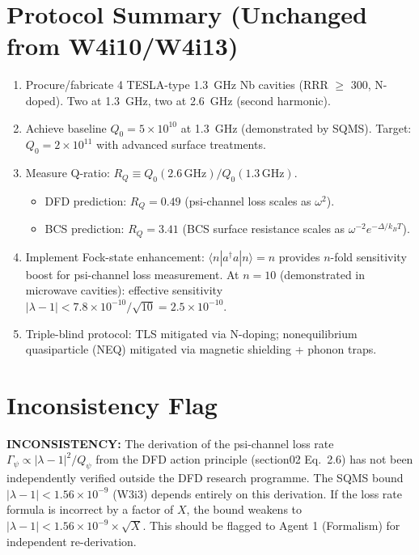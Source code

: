 \documentclass[11pt]{article}
\newcommand{\ee}[1]{\times 10^{#1}}
\newcommand{\lbone}{|\lambda - 1|}
\newcommand{\Qpsi}{Q_\psi}
\newcommand{\inconsistency}[1]{\textcolor{red!70!black}{\textbf{INCONSISTENCY:} #1}}
\begin{document}
\section{Protocol Summary (Unchanged from W4i10/W4i13)}

\begin{enumerate}[label=\textbf{Phase I.\arabic*:}]
\item Procure/fabricate 4 TESLA-type 1.3~GHz Nb cavities (RRR $\geq$ 300,
  N-doped). Two at 1.3~GHz, two at 2.6~GHz (second harmonic).

\item Achieve baseline $Q_0 = 5\ee{10}$ at 1.3~GHz (demonstrated by SQMS).
  Target: $Q_0 = 2\ee{11}$ with advanced surface treatments.

\item Measure Q-ratio: $R_Q \equiv Q_0(2.6\,\text{GHz}) / Q_0(1.3\,\text{GHz})$.
  \begin{itemize}[nosep]
  \item DFD prediction: $R_Q = 0.49$ (psi-channel loss scales as $\omega^2$).
  \item BCS prediction: $R_Q = 3.41$ (BCS surface resistance scales as
    $\omega^{-2} e^{-\Delta/k_BT}$).
  \end{itemize}

\item Implement Fock-state enhancement: $\langle n | a^\dagger a | n \rangle = n$
  provides $n$-fold sensitivity boost for psi-channel loss measurement.
  At $n = 10$ (demonstrated in microwave cavities): effective sensitivity
  $\lbone < 7.8\ee{-10}/\sqrt{10} = 2.5\ee{-10}$.

\item Triple-blind protocol: TLS mitigated via N-doping; nonequilibrium
  quasiparticle (NEQ) mitigated via magnetic shielding + phonon traps.
\end{enumerate}

\section{Inconsistency Flag}

\inconsistency{The derivation of the psi-channel loss rate
$\Gamma_\psi \propto |\lambda-1|^2 / \Qpsi$ from the DFD action
principle (section02 Eq.~2.6) has not been independently verified
outside the DFD research programme. The SQMS bound $\lbone < 1.56\ee{-9}$
(W3i3) depends entirely on this derivation. If the loss rate formula
is incorrect by a factor of $X$, the bound weakens to
$\lbone < 1.56\ee{-9} \times \sqrt{X}$. This should be flagged to
Agent 1 (Formalism) for independent re-derivation.}
\end{document}
